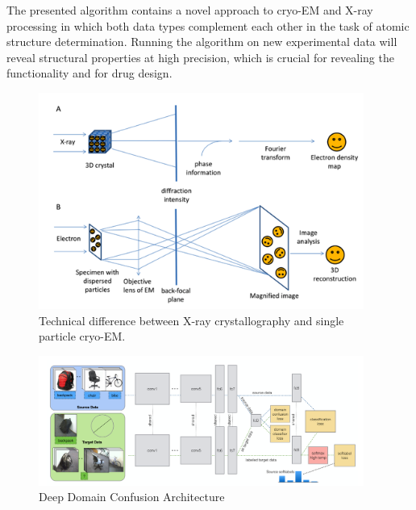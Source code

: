 The presented  algorithm contains a novel approach  to  cryo-EM and X-ray processing in which both data types complement each other in the task of atomic structure determination.
Running the algorithm on new experimental data will reveal structural properties at high precision, which is crucial for revealing the functionality and for drug design.



\begin{figure}[!ht]

\includegraphics[width=0.95\textwidth]{pics/em_cryst}
\caption{Technical difference between X-ray crystallography and single particle cryo-EM. }\label{f:em_cryst}
\end{figure}

\begin{figure}[!ht]

\includegraphics[width=0.95\textwidth]{pics/dom_conf_1}
\caption{Deep Domain Confusion Architecture }\label{f:dom_conf_1}
\end{figure}



